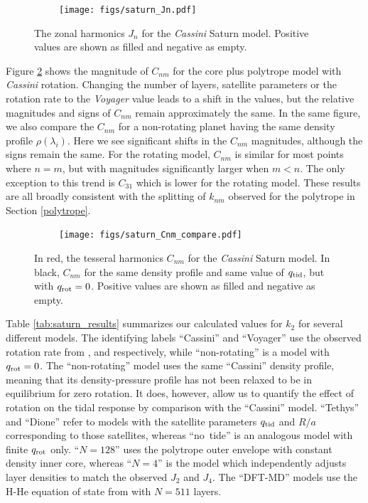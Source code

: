\begin{figure}[h!]  
  \centering
    \texttt{[image: figs/saturn\_Jn.pdf]}
\caption{ The zonal harmonics $J_n$ for the \textit{Cassini} Saturn model. Positive
values are shown as filled and negative  as empty.}
\label{fig:saturn_zonal}
\end{figure}

Figure \ref{fig:saturn_tesseral} shows the magnitude of $C_{nm}$ for the core plus
polytrope model with \textit{Cassini} rotation. Changing the number of layers,
satellite parameters or the rotation rate to the \textit{Voyager} value leads to a
shift in the values, but the relative magnitudes and signs of $C_{nm}$ remain
approximately the same. In the same figure, we also compare the $C_{nm}$ for a
non-rotating planet having the same density profile $\rho( \lambda_i)$. Here we see
significant shifts in the $C_{nm}$ magnitudes, although the signs remain the same.
For the rotating model, $C_{nm}$ is similar for most points where $n=m$, but with
magnitudes significantly larger when $m<n$. The only exception to this trend is
$C_{31}$ which is lower for the rotating model. These results are all broadly
consistent with the splitting of $k_{nm}$ observed for the polytrope in Section
\ref{polytrope}.

\begin{figure}[h!]  
  \centering
    \texttt{[image: figs/saturn\_Cnm\_compare.pdf]}
\caption{ In red, the tesseral harmonics $C_{nm}$ for the \textit{Cassini} Saturn
model. In black, $C_{nm}$ for the same density profile and same value of $q_{\rm
tid}$, but with $q_{\rm rot}=0$. Positive values are shown as filled and negative as
empty.} \label{fig:saturn_tesseral}
\end{figure}

Table \ref{tab:saturn_results} summarizes our calculated values for $k_2$ for several
different models. The identifying labels ``Cassini'' and ``Voyager'' use the
observed rotation rate from \citet{Jacobson2006}, and \citet{desch1981}
respectively, while ``non-rotating'' is a model with $q_{\rm rot}=0$. The
``non-rotating'' model uses the same ``Cassini'' density profile, meaning that
its density-pressure profile has not been relaxed to be in equilibrium for zero
rotation.  It does, however, allow us to quantify the effect of rotation on the
tidal response by comparison with the ``Cassini'' model. ``Tethys'' and
``Dione'' refer to models with the satellite parameters $q_{\rm tid}$ and $R/a$
corresponding to those satellites, whereas ``no~tide'' is an analogous model
with finite $q_{\rm rot}$ only. ``$N=128$'' uses the polytrope outer envelope
with constant density inner core, whereas ``$N=4$'' is the model which
independently adjusts layer densities to match the observed $J_2$ and $J_4$.
The ``DFT-MD'' models use the H-He equation of state from
\citet{hubbard2016} with $N=511$ layers.

